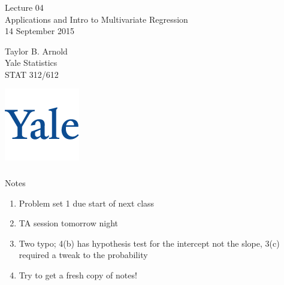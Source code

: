 



\begin{frame}[fragile] \frametitle{}

\vfill

{\fontsize{0.7cm}{0cm}\selectfont Lecture 04 \\\vspace{0.2cm} Applications
and Intro to Multivariate Regression}\\\vspace{0.5cm}
14 September 2015

\vspace{2cm}

\begin{minipage}{0.6\textwidth}
Taylor B. Arnold \\
Yale Statistics \\
STAT 312/612
\end{minipage}
\hfill
\begin{minipage}{0.3\textwidth}\raggedleft
\includegraphics[scale=0.3]{../yale-logo.png}
\end{minipage}%

\end{frame}

\begin{frame}[fragile] \frametitle{}

{\color{yaleblue}\fontsize{16pt}{20pt}\selectfont Notes}

\begin{enumerate}
\item Problem set 1 due start of next class
\item TA session tomorrow night
\item Two typo; 4(b) has hypothesis test for the intercept not the slope,
3(c) required a tweak to the probability
\item Try to get a fresh copy of notes!
\end{enumerate}

\end{frame}

